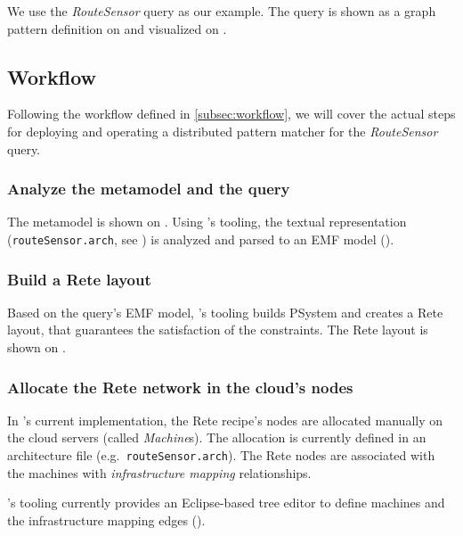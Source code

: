 
We use the \textit{RouteSensor} query as our example. The query is shown as a graph pattern definition on  and visualized on .

\subsection{Workflow}

Following the workflow defined in \autoref{subsec:workflow}, we will cover the actual steps for deploying and operating a distributed pattern matcher for the \textit{RouteSensor} query.

\subsubsection{Analyze the metamodel and the query}

The metamodel is shown on . Using \eiq{}'s tooling, the textual representation (\texttt{routeSensor.arch}, see ) is analyzed and parsed to an EMF model ().


\subsubsection{Build a Rete layout}

Based on the query's EMF model, \eiq{}'s tooling builds PSystem and creates a Rete layout, that guarantees the satisfaction of the constraints. The Rete layout is shown on . 

\subsubsection{Allocate the Rete network in the cloud's nodes} 

In \iqd{}'s current implementation, the Rete recipe's nodes are allocated manually on the cloud servers (called \textit{Machine}s). The allocation is currently defined in an architecture file (e.g.\ \texttt{routeSensor.arch}). The Rete nodes are associated with the machines with \textit{infrastructure mapping} relationships.

\iqd{}'s tooling currently provides an Eclipse-based tree editor to define machines and the infrastructure mapping edges ().

